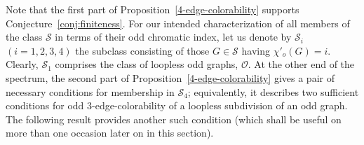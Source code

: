 \documentclass[a4paper,12pt]{article}
\numberwithin{equation}{section}
\begin{document}
Note that the first part of Proposition~\ref{4-edge-colorability} supports Conjecture~\ref{conj:finiteness}. For our intended characterization of all members of the class $\mathcal{S}$ in terms of their odd chromatic index, let us denote by $\mathcal{S}_i$ $(i=1,2,3,4)$ the subclass consisting of those $G\in\mathcal{S}$ having $\chi'_o(G)=i$. Clearly, $\mathcal{S}_1$ comprises the class of loopless odd graphs, $\mathcal{O}$. At the other end of the spectrum, the second part of Proposition~\ref{4-edge-colorability} gives a pair of necessary conditions for membership in $\mathcal{S}_4$;  equivalently, it describes two sufficient conditions for odd $3$-edge-colorability of a loopless subdivision of an odd graph. The following result provides another such condition (which shall be useful on more than one occasion later on in this section).
\end{document}
